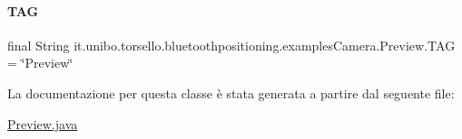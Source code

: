 \paragraph{\texorpdfstring{T\+AG}{TAG}}
{\footnotesize\ttfamily final String it.\+unibo.\+torsello.\+bluetoothpositioning.\+examples\+Camera.\+Preview.\+T\+AG = \char`\"{}Preview\char`\"{}\hspace{0.3cm}{\ttfamily [private]}}



La documentazione per questa classe è stata generata a partire dal seguente file\+:\begin{DoxyCompactItemize}
\item 
\hyperlink{Preview_8java}{Preview.\+java}\end{DoxyCompactItemize}
